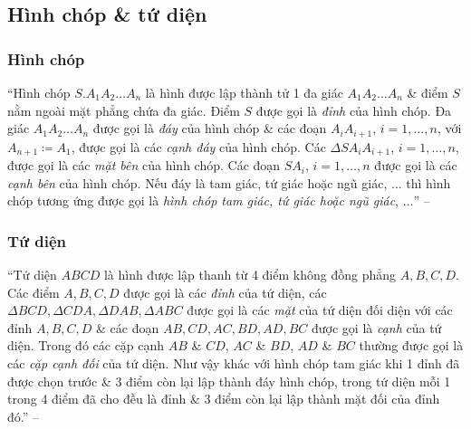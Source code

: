 \documentclass[oneside]{book}
\numberwithin{equation}{section}
\begin{document}
\subsection{Hình chóp \& tứ diện}

\subsubsection{Hình chóp}
``Hình chóp $S.A_1A_2\ldots A_n$ là hình được lập thành tử 1 đa giác $A_1A_2\ldots A_n$ \& điểm $S$ nằm ngoài mặt phẳng chứa đa giác. Điểm $S$ được gọi là \textit{đỉnh} của hình chóp. Đa giác $A_1A_2\ldots A_n$ được gọi là \textit{đáy} của hình chóp \& các đoạn $A_iA_{i+1}$, $i = 1,\ldots,n$, với $A_{n+1}\coloneqq A_1$, được gọi là các \textit{cạnh đáy} của hình chóp. Các $\Delta SA_iA_{i+1}$, $i = 1,\ldots,n$, được gọi là các \textit{mặt bên} của hình chóp. Các đoạn $SA_i$, $i = 1,\ldots,n$ được gọi là các \textit{cạnh bên} của hình chóp. Nếu đáy là tam giác, tứ giác hoặc ngũ giác, $\ldots$ thì hình chóp tương ứng được gọi là \textit{hình chóp tam giác, tứ giác hoặc ngũ giác}, $\ldots$'' -- \cite[pp. 51--52]{TL_chuyen_Toan_Hinh_Hoc_11}

\subsubsection{Tứ diện}
``Tứ diện $ABCD$ là hình được lập thanh từ 4 điểm không đồng phẳng $A,B,C,D$. Các điểm $A,B,C,D$ được gọi là các \textit{đỉnh} của tứ diện, các $\Delta BCD,\Delta CDA,\Delta DAB,\Delta ABC$ được gọi là các \textit{mặt} của tứ diện đối diện với các đỉnh $A,B,C,D$ \& các đoạn $AB,CD,AC,BD,AD,BC$ được gọi là \textit{cạnh} của tứ diện. Trong đó các cặp cạnh $AB$ \& $CD$, $AC$ \& $BD$, $AD$ \& $BC$ thường được gọi là các \textit{cặp cạnh đối} của tứ diện. Như vậy khác với hình chóp tam giác khi 1 đỉnh đã được chọn trước \& 3 điểm còn lại lập thành đáy hình chóp, trong tứ diện mỗi 1 trong 4 điểm đã cho đều là đỉnh \& 3 điểm còn lại lập thành mặt đối của đỉnh đó.'' -- \cite[p. 52]{TL_chuyen_Toan_Hinh_Hoc_11}
\end{document}
